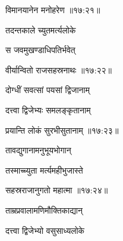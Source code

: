 \nemslokad

{\devanagarifontbold विमानयानेन मनोहरेण {॥१७:२१॥} \veg\dontdisplaylinenum }%
 
\ujvers{}

\nemslokab

{\devanagarifontbold तदन्तकाले च्युतमर्त्यलोके  \danda\dontdisplaylinenum }%
 
\nemslokac

{\devanagarifontbold स जवमुखण्डाधिपतिर्भवेत् }%
  \dontdisplaylinenum

\nemslokad

{\devanagarifontbold वीर्यान्वितो राजसहस्रनाथः {॥१७:२२॥} \veg\dontdisplaylinenum }%
 
\ujvers{}

\nemslokab

{\devanagarifontbold दोग्धीं सवत्सां पयसां द्विजानाम्  \danda\dontdisplaylinenum }%
 
\nemslokac

{\devanagarifontbold दत्त्वा द्विजेभ्यः समलङ्कृतानाम् }%
  \dontdisplaylinenum

\nemslokad

{\devanagarifontbold प्रयान्ति लोकं सुरभीसुतानाम् {॥१७:२३॥} \veg\dontdisplaylinenum }%
 
\ujvers{}    %


\nemslokab

{\devanagarifontbold तावद्युगानामनुभूयभोगान्  \danda\dontdisplaylinenum }%
 
\nemslokac

{\devanagarifontbold तस्माच्च्युता मर्त्यमहीभुजास्ते }%
  \dontdisplaylinenum

\nemslokad

{\devanagarifontbold सहस्रराजानुगतो महात्मा {॥१७:२४॥} \veg\dontdisplaylinenum }%
 
\ujvers{}

\nemslokab

{\devanagarifontbold ताम्रप्रवालामणिमौक्तिकाद्यान्  \danda\dontdisplaylinenum }%
 
\nemslokac

{\devanagarifontbold दत्त्वा द्विजेभ्यो वसुसाध्यलोके }%
  \dontdisplaylinenum

